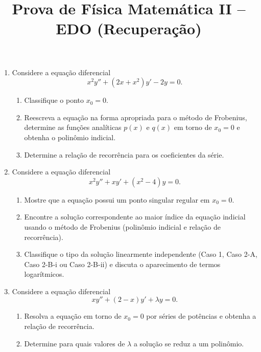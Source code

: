 \newif\ifuseseminar
\useseminartrue


\title{Prova de Física Matemática II -- EDO (Recuperação)}



\begin{enumerate}

	\item Considere a equação diferencial
	      $$
		      x^2 y'' + (2x+x^2)y' - 2y = 0.
	      $$
	      \begin{enumerate}
		      \item Classifique o ponto $x_0 = 0$.
		      \item Reescreva a equação na forma apropriada para o método de Frobenius,
		            determine as funções analíticas $p(x)$ e $q(x)$ em torno de
		            $x_0 = 0$ e obtenha o polinômio indicial.
		      \item Determine a relação de recorrência para os coeficientes da série.
	      \end{enumerate}

	\item Considere a equação diferencial
	      $$
		      x^2 y'' + xy' + (x^2 - 4)y = 0.
	      $$
	      \begin{enumerate}
		      \item Mostre que a equação possui um ponto singular regular em
		            $x_0 = 0$.
		      \item Encontre a solução correspondente ao maior índice da equação
		            indicial usando o método de Frobenius (polinômio indicial e
		            relação de recorrência).
		      \item Classifique o tipo da solução linearmente independente (Caso 1,
		            Caso 2-A, Caso 2-B-i ou Caso 2-B-ii) e discuta o aparecimento
		            de termos logarítmicos.
	      \end{enumerate}

	\item Considere a equação diferencial
	      $$
		      xy'' + (2-x)y' + \lambda y = 0.
	      $$
	      \begin{enumerate}
		      \item Resolva a equação em torno de $x_0 = 0$ por séries de potências
		            e obtenha a relação de recorrência.
		      \item Determine para quais valores de $\lambda$ a solução se reduz a
		            um polinômio.
	      \end{enumerate}


\end{enumerate}
